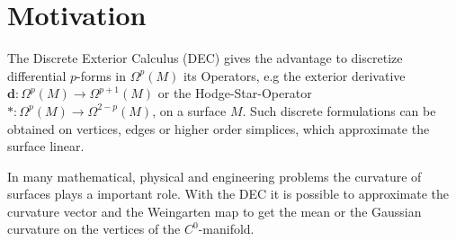\documentclass[a2paper]{scrartcl}
\newcommand{\exd}{\mathbf{d}}
\begin{document}
\pagestyle{empty}

\section*{Motivation}
The Discrete Exterior Calculus (DEC) gives the advantage to discretize differential \( p \)-forms in \( \Omega^{p}(M) \) its Operators, 
e.g the exterior derivative \( \exd:\Omega^{p}(M) \rightarrow \Omega^{p+1}(M) \) 
or the \mbox{Hodge-Star-Operator \( *:\Omega^{p}(M) \rightarrow \Omega^{2-p}(M) \),} on a surface \( M \).
Such discrete formulations can be obtained on vertices, edges or higher order simplices, which approximate the surface linear.

In many mathematical, physical and engineering problems the curvature of surfaces plays a important role. 
With the DEC it is possible to approximate the curvature vector and the Weingarten map to get the mean or the Gaussian curvature on the vertices of the \( C^{0} \)-manifold.

\pagebreak
\end{document}
